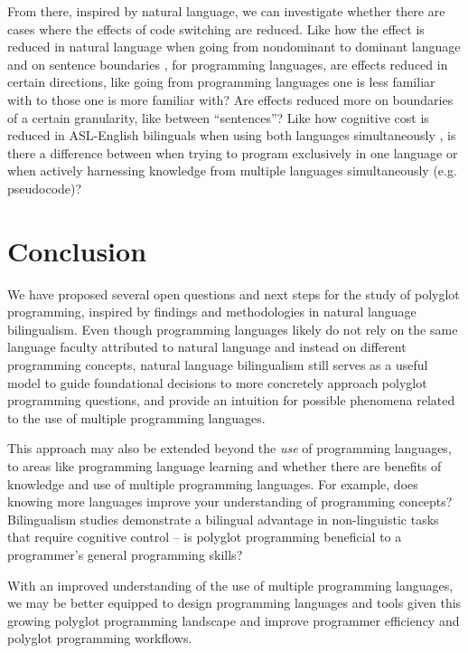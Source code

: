 \documentclass[a4paper,UKenglish,cleveref, autoref]{oasics-v2019}
\begin{document}
From there, inspired by natural language, we can investigate whether there are cases where the effects of code switching are reduced. Like how the effect is reduced in natural language when going from nondominant to dominant language and on sentence boundaries \cite{pl0028}, for programming languages, are effects reduced in certain directions, like going from programming languages one is less familiar with to those one is more familiar with? Are effects reduced more on boundaries of a certain granularity, like between “sentences”? Like how cognitive cost is reduced in ASL-English bilinguals when using both languages simultaneously \cite{pl0029}, is there a difference between when trying to program exclusively in one language or when actively harnessing knowledge from multiple languages simultaneously (e.g. pseudocode)? 

\section{Conclusion}
We have proposed several open questions and next steps for the study of polyglot programming, inspired by findings and methodologies in natural language bilingualism. Even though programming languages likely do not rely on the same language faculty attributed to natural language and instead on different programming concepts, natural language bilingualism still serves as a useful model to guide foundational decisions to more concretely approach polyglot programming questions, and provide an intuition for possible phenomena related to the use of multiple programming languages. 

This approach may also be extended beyond the \textit{use} of programming languages, to areas like programming language learning and whether there are benefits of knowledge and use of multiple programming languages. For example, does knowing more languages improve your understanding of programming concepts? Bilingualism studies demonstrate a bilingual advantage in non-linguistic tasks that require cognitive control \cite{bial1} -- is polyglot programming beneficial to a programmer's general programming skills? 

With an improved understanding of the use of multiple programming languages, we may be better equipped to design programming languages and tools given this growing polyglot programming landscape and improve programmer efficiency and polyglot programming workflows. 

\appendix


\end{document}
